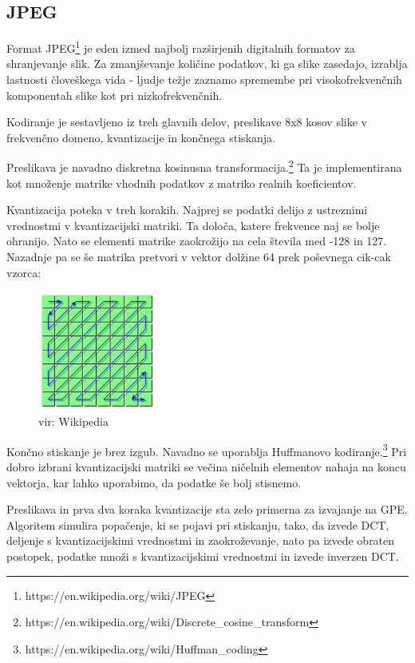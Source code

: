 \documentclass[journal,a4paper,twoside]{sty/IEEEtran}
\begin{document}
\subsection{JPEG}

Format JPEG\footnote{https://en.wikipedia.org/wiki/JPEG} je eden izmed najbolj razširjenih digitalnih formatov za shranjevanje slik.
Za zmanjševanje količine podatkov, ki ga slike zasedajo, izrablja lastnosti človeškega vida - ljudje težje zaznamo spremembe pri visokofrekvenčnih
	komponentah slike kot pri nizkofrekvenčnih.

Kodiranje je sestavljeno iz treh glavnih delov, preslikave 8x8 kosov slike v frekvenčno domeno, kvantizacije in končnega stiskanja.

Preslikava je navadno diskretna kosinusna transformacija.\footnote{https://en.wikipedia.org/wiki/Discrete\_cosine\_transform}
Ta je implementirana kot množenje matrike vhodnih podatkov z matriko realnih koeficientov.

Kvantizacija poteka v treh korakih.
Najprej se podatki delijo z ustreznimi vrednostmi v kvantizacijski matriki.
Ta določa, katere frekvence naj se bolje ohranijo.
Nato se elementi matrike zaokrožijo na cela števila med -128 in 127.
Nazadnje pa se še matrika pretvori v vektor dolžine 64 prek poševnega cik-cak vzorca:

\begin{figure}[h]
\centering
\includegraphics[width=0.35\textwidth]{jpeg_zigzag}
\caption{vir: Wikipedia}
\end{figure}

Končno stiskanje je brez izgub.
Navadno se uporablja Huffmanovo kodiranje.\footnote{https://en.wikipedia.org/wiki/Huffman\_coding}
Pri dobro izbrani kvantizacijski matriki se večina ničelnih elementov nahaja na koncu vektorja, kar lahko uporabimo, da podatke še bolj stisnemo.

Preslikava in prva dva koraka kvantizacije sta zelo primerna za izvajanje na GPE.
Algoritem simulira popačenje, ki se pojavi pri stiskanju, tako, da izvede DCT, deljenje s kvantizacijskimi vrednostmi in zaokroževanje, nato pa izvede
	obraten postopek, podatke množi s kvantizacijskimi vrednostmi in izvede inverzen DCT.
\end{document}
